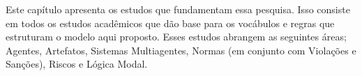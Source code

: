 Este capítulo apresenta os estudos que fundamentam essa pesquisa. Isso consiste em todos os estudos acadêmicos que dão base para os vocábulos e regras que estruturam o modelo aqui proposto. Esses estudos abrangem as seguintes áreas; Agentes, Artefatos, Sistemas Multiagentes, Normas (em conjunto com Violações e Sanções), Riscos e Lógica Modal. 